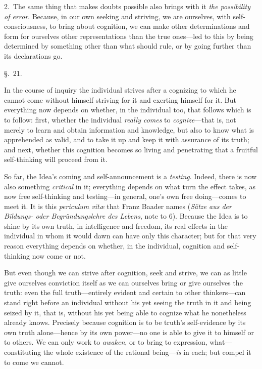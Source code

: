 \documentclass[12pt,a4paper]{book}
\begin{document}
2.~The same thing that makes doubts possible also brings with it \emph{the possibility of
error}. Because, in our own seeking and striving, we are ourselves, with self-consciousness, to
bring about cognition, we can make other determinations and form for ourselves other
representations than the true ones---led to this by being determined by something other than
what should rule, or by going further than its declarations go.

\begin{center}\large\S.~21.\end{center}
In the course of inquiry the individual strives after a cognizing to which he cannot come
without himself striving for it and exerting himself for it. But everything now depends on
whether, in the individual too, that follows which is to follow: first, whether the individual
\emph{really comes} to \emph{cognize}---that is, not merely to learn and obtain information and
knowledge, but also to know what is apprehended as valid, and to take it up and keep it with
assurance of its truth; and next, whether this cognition becomes so living and penetrating that
a fruitful self-thinking will proceed from it.

So far, the Idea's coming and self-announcement is a \emph{testing}. Indeed, there is now also
something \emph{critical} in it; everything depends on what turn the effect takes, as now free
self-thinking and testing---in general, one's own free doing---comes to meet it. It is this
\emph{periculum vitæ} that Franz Baader names (\textit{Sätze aus der Bildungs- oder
Begründungslehre des Lebens}, note to 6). Because the Idea is to shine by its own truth, in
intelligence and freedom, its real effects in the individual in whom it would dawn can have only
this character; but for that very reason everything depends on whether, in the individual,
cognition and self-thinking now come or not.

But even though we can strive after cognition, seek and strive, we can as little give ourselves
conviction itself as we can ourselves bring or give ourselves the truth: even the full
truth---entirely evident and certain to other thinkers---can stand right before an individual
without his yet seeing the truth in it and being seized by it, that is, without his yet being
able to cognize what he nonetheless already knows. Precisely because cognition is to be truth's
self-evidence by its own truth alone---hence by its own power---no one is able to give it to
himself or to others. We can only work to \emph{awaken}, or to bring to expression, what---constituting
the whole existence of the rational being---\emph{is} in each; but compel it to come we cannot.
\end{document}
